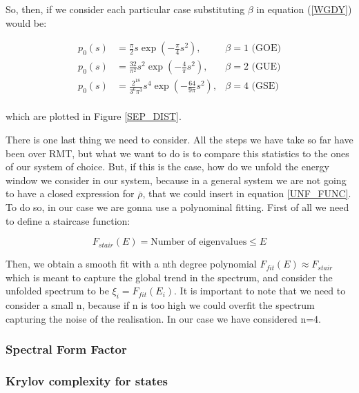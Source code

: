 \documentclass[11pt,a4paper]{article}
\begin{document}
{\noindent So, then, if we consider each particular case substituting $\beta$ in equation (\ref{WGDY}) would be:}

\begin{equation}
    \begin{aligned}
        p_0(s) &= \frac{\pi}{2}s\exp\left(-\frac{\pi}{4}s^2\right) , &\beta = 1 \text{ (GOE)}\\
        p_0(s) &= \frac{32}{\pi^2}s^2\exp\left(-\frac{4}{\pi}s^2\right) , &\beta = 2 \text{ (GUE)}\\
        p_0(s) &= \frac{2^{18}}{3^6\pi^3}s^4\exp\left(-\frac{64}{9\pi}s^2\right) , &\beta = 4 \text{ (GSE)}\\
    \end{aligned}
\end{equation}

{\noindent which are plotted in Figure \ref{SEP_DIST}.}

There is one last thing we need to consider. All the steps we have take so far have been over RMT, but what we want to do is to compare this statistics to the ones of our system of choice. But, if this is the case, how do we unfold the energy window we consider in our system, because in a general system we are not going to have a closed expression for $\overline{\rho}$, that we could insert in equation \ref{UNF_FUNC}. To do so, in our case we are gonna use a polynominal fitting. First of all we need to define a staircase function:

\begin{equation}
    F_{stair}(E) = \text{Number of eigenvalues}\leq E
\end{equation}

Then, we obtain a smooth fit with a nth degree polynomial $F_{fit}(E)\approx F_{stair}$ which is meant to capture the global trend in the spectrum, and consider the unfolded spectrum to be $\xi_i = F_{fit}(E_i)$. It is important to note that we need to consider a small n, because if n is too high we could overfit the spectrum capturing the noise of the realisation. In our case we have considered n=4.

\subsubsection{Spectral Form Factor}




\subsubsection{Krylov complexity for states}
\end{document}
